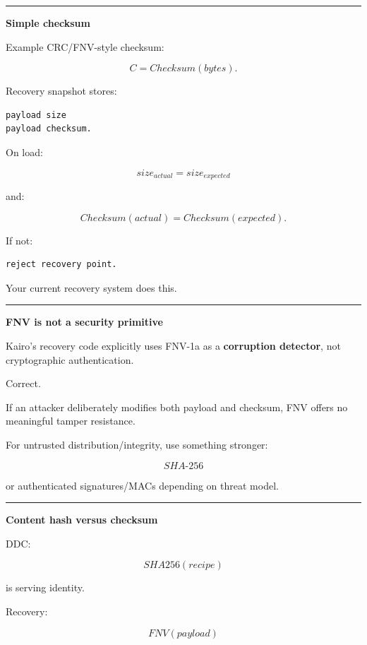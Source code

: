 \begin{center}\rule{0.5\linewidth}{0.5pt}\end{center}

\textbf{Simple checksum}

Example CRC/FNV-style checksum:

\[
C=Checksum(bytes).
\]

Recovery snapshot stores:

\begin{verbatim}
payload size
payload checksum.
\end{verbatim}

On load:

\[
size_{actual}=size_{expected}
\]

and:

\[
Checksum(actual)=Checksum(expected).
\]

If not:

\begin{verbatim}
reject recovery point.
\end{verbatim}

Your current recovery system does this.

\begin{center}\rule{0.5\linewidth}{0.5pt}\end{center}

\textbf{FNV is not a security primitive}

Kairo's recovery code explicitly uses FNV-1a as a \textbf{corruption detector}, not cryptographic authentication.

Correct.

If an attacker deliberately modifies both payload and checksum, FNV offers no meaningful tamper resistance.

For untrusted distribution/integrity, use something stronger:

\[
SHA\text{-}256
\]

or authenticated signatures/MACs depending on threat model.

\begin{center}\rule{0.5\linewidth}{0.5pt}\end{center}

\textbf{Content hash versus checksum}

DDC:

\[
SHA256(recipe)
\]

is serving identity.

Recovery:

\[
FNV(payload)
\]

